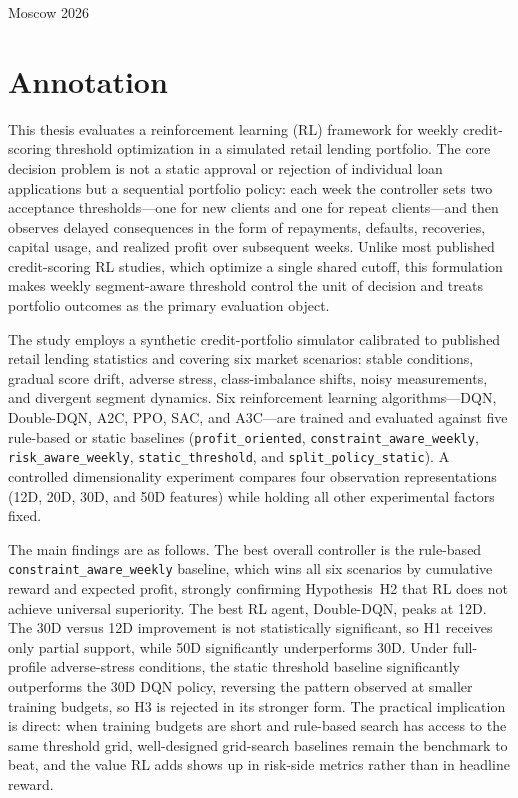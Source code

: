\documentclass[12pt,a4paper]{article}
\begin{document}
\begin{titlepage}
    \vspace{\fill}

    \begin{center}
        Moscow 2026
    \end{center}

\end{titlepage}

\setcounter{page}{2}

\section*{Annotation}

This thesis evaluates a reinforcement learning (RL) framework for weekly credit-scoring threshold optimization in a simulated retail lending portfolio. The core decision problem is not a static approval or rejection of individual loan applications but a sequential portfolio policy: each week the controller sets two acceptance thresholds---one for new clients and one for repeat clients---and then observes delayed consequences in the form of repayments, defaults, recoveries, capital usage, and realized profit over subsequent weeks. Unlike most published credit-scoring RL studies, which optimize a single shared cutoff, this formulation makes weekly segment-aware threshold control the unit of decision and treats portfolio outcomes as the primary evaluation object.

The study employs a synthetic credit-portfolio simulator calibrated to published retail lending statistics and covering six market scenarios: stable conditions, gradual score drift, adverse stress, class-imbalance shifts, noisy measurements, and divergent segment dynamics. Six reinforcement learning algorithms---DQN, Double-DQN, A2C, PPO, SAC, and A3C---are trained and evaluated against five rule-based or static baselines (\texttt{profit\_oriented}, \texttt{constraint\_aware\_weekly}, \texttt{risk\_aware\_weekly}, \texttt{static\_threshold}, and \texttt{split\_policy\_static}). A controlled dimensionality experiment compares four observation representations (12D, 20D, 30D, and 50D features) while holding all other experimental factors fixed.

The main findings are as follows. The best overall controller is the rule-based \texttt{constraint\_aware\_weekly} baseline, which wins all six scenarios by cumulative reward and expected profit, strongly confirming Hypothesis~H2 that RL does not achieve universal superiority. The best RL agent, Double-DQN, peaks at 12D. The 30D versus 12D improvement is not statistically significant, so H1 receives only partial support, while 50D significantly underperforms 30D. Under full-profile adverse-stress conditions, the static threshold baseline significantly outperforms the 30D DQN policy, reversing the pattern observed at smaller training budgets, so H3 is rejected in its stronger form. The practical implication is direct: when training budgets are short and rule-based search has access to the same threshold grid, well-designed grid-search baselines remain the benchmark to beat, and the value RL adds shows up in risk-side metrics rather than in headline reward.
\end{document}
